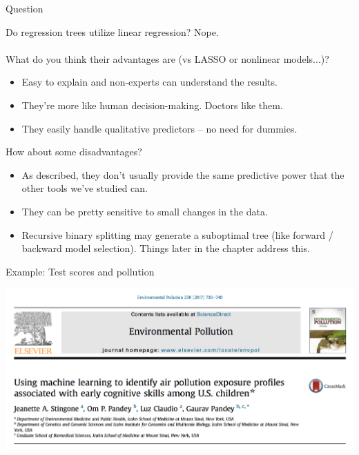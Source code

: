\documentclass[mathserif, aspectratio=169]{beamer}
\begin{document}
\begin{frame}{Question}

Do regression trees utilize linear regression? \pause Nope.  \\~\\

What do you think their advantages are (vs LASSO or nonlinear models...)? \pause

\begin{itemize}
\item Easy to explain and non-experts can understand the results.
\item They're more like human decision-making.  Doctors like them.
\item They easily handle qualitative predictors -- no need for dummies.
\end{itemize}

\pause How about some disadvantages? \pause

\begin{itemize}
\item As described, they don't usually provide the same predictive power that the other tools we've studied can.
\item They can be pretty sensitive to small changes in the data. 
\item Recursive binary splitting may generate a suboptimal tree (like forward / backward model selection).  Things later in the chapter address this.
\end{itemize}
\end{frame}


\begin{frame}{Example: Test scores and pollution}

\includegraphics[width=\textwidth]{stingone_etal}
\end{frame}
\end{document}
